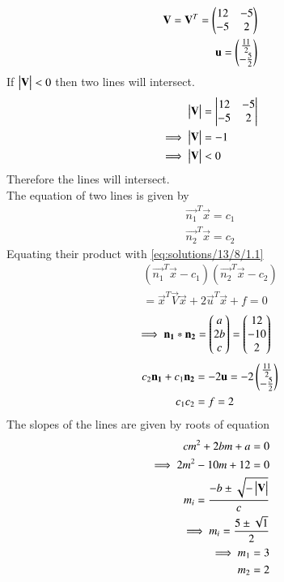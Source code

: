 \begin{align}
    \mathbf{V}=\mathbf{V}^T=\begin{pmatrix}12 & -5 \\ -5 & 2\end{pmatrix}\label{eq:solutions/13/8/2.17}\\
    \mathbf{u}=\begin{pmatrix}\frac{11}{2} \\ -\frac{5}{2}\end{pmatrix}\label{eq:solutions/13/8/2.18}
\end{align}
\noindent
If $\begin{vmatrix}\mathbf{V}\end{vmatrix}<0$ then two lines will intersect.
\begin{align}
    \begin{vmatrix}\mathbf{V}\end{vmatrix}&=\begin{vmatrix}12 & -5 \\ -5 & 2\end{vmatrix}\\
    \implies\begin{vmatrix}\mathbf{V}\end{vmatrix}&=-1\\
    \implies\begin{vmatrix}\mathbf{V}\end{vmatrix}&<0
\end{align}
\noindent
Therefore the lines will intersect.\\
The equation of two lines is given by
\begin{align}
    \vec{n_1}^T\vec{x}=c_1\label{eq:solutions/13/8/1.12}\\
    \vec{n_2}^T\vec{x}=c_2\label{eq:solutions/13/8/1.13}
\end{align}
Equating their product with \eqref{eq:solutions/13/8/1.1}
\begin{multline}
    (\vec{n_1}^T\vec{x}-c_1)(\vec{n_2}^T\vec{x}-c_2)\\=\vec{x}^T\vec{V}\vec{x}+2\vec{u}^T\vec{x}+f=0
\end{multline}
\begin{align}
    \implies\mathbf{n_1}*\mathbf{n_2}&=\begin{pmatrix}a \\ 2b \\c\end{pmatrix}=\begin{pmatrix}12\\-10\\2\end{pmatrix}\label{eq:solutions/13/8/conv}
\end{align}
\begin{align}
    c_2\mathbf{n_1}+c_1\mathbf{n_2}&=-2\mathbf{u}=-2\begin{pmatrix}\frac{11}{2} \\ -\frac{5}{2}\end{pmatrix}\label{eq:solutions/13/8/1.16}\\
    c_1c_2&=f=2
\end{align}
The slopes of the lines are given by roots of equation
\begin{align}
    cm^2+2bm+a=0\label{eq:solutions/13/8/poly}\\
    \implies 2m^2-10m+12=0\\
    m_i=\frac{-b\pm{\sqrt{-\ensuremath{\begin{vmatrix}\mathbf{V}\end{vmatrix}}}}}{c}\\
    \implies m_i=\frac{5\pm{\sqrt{1}}}{2}\\
    \implies m_1=3\\
     m_2=2
\end{align}
